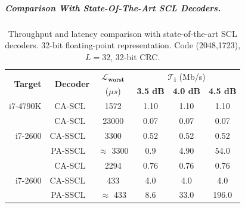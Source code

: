 \subparagraph{Comparison With State-Of-The-Art SCL Decoders.}

\begin{table}
  \centering
  \caption{Throughput and latency comparison with state-of-the-art SCL decoders.
    32-bit floating-point representation. Code (2048,1723), $L = 32$, 32-bit
    CRC.}
  \label{tab:polar_scl_perfs_comparison}
  \begin{tabular}{r | r c  c c c}
    \multirow{2}{*}{\textbf{Target}} & \multirow{2}{*}{\textbf{Decoder}} & \multirow{1}{*}{\textbf{$\bm{\mathcal{L}_{worst}}$}} & \multicolumn{3}{c}{$\bm{\mathcal{T}_i}$ (Mb/s)} \\
    \cline{4-6}
    &                                & ($\mu s$)                         & \textbf{3.5 dB} & \textbf{4.0 dB} & \textbf{4.5 dB} \\
    \hline
    \hline
    \multirow{1}{*}{i7-4790K}
    & CA-SCL~\cite{Shen2016}         &  1572                             &  1.10           &  1.10           &   1.10          \\
    \hline
    \multirow{3}{*}{i7-2600}
    & CA-SCL~\cite{Sarkis2014b}      & 23000                             &  0.07           &  0.07           &   0.07          \\
    & CA-SSCL~\cite{Sarkis2014b}     &  3300                             &  0.52           &  0.52           &   0.52          \\
    & PA-SSCL~\cite{Sarkis2014b}     & $\approx$ 3300                    &  0.9            &  4.90           &  54.0           \\
    \hline
    \multirow{3}{*}{i7-2600}
    & CA-SCL~\cite{Sarkis2016}       &  2294                             &  0.76           &  0.76           &   0.76          \\
    & CA-SSCL~\cite{Sarkis2016}      &   433                             &  4.0            &  4.0            &   4.0           \\
    & PA-SSCL~\cite{Sarkis2016}      & $\approx$ 433                     &  8.6            & 33.0            & 196.0           \\
    \hline

\end{tabular}
\end{table}
